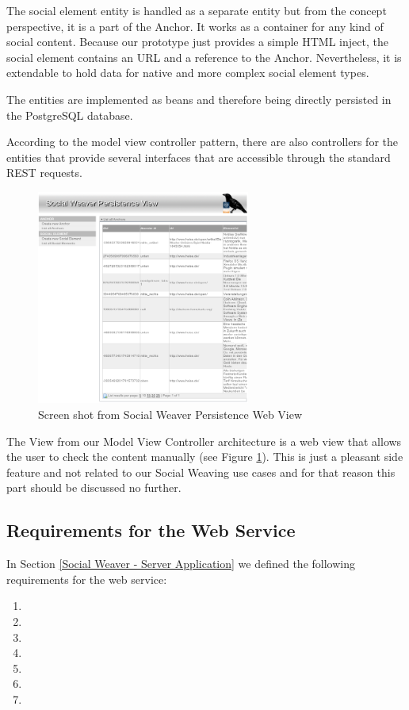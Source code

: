 The social element entity is handled as a separate entity but from the concept perspective, it is a part of the Anchor. It works as a container for any kind of social content. Because our prototype just provides a simple HTML inject, the social element contains an URL and a reference to the Anchor. Nevertheless, it is extendable to hold data for native and more complex social element types. 

The entities are implemented as beans and therefore being directly persisted in the PostgreSQL database.

According to the model view controller pattern, there are also controllers for the entities that provide several interfaces that are accessible through the standard REST requests. 

\begin{figure}\centering
		\includegraphics[width=7cm]{images/sowe-mvc-view-screenshot.png}
		\caption{Screen shot from Social Weaver Persistence Web View}
		\label{sowe-mvc-view-screenshot}
\end{figure} 

The View from our Model View Controller architecture is a web view that allows the user to check the content manually (see Figure \ref{sowe-mvc-view-screenshot}). This is just a pleasant side feature and not related to our Social Weaving use cases and for that reason this part should be discussed no further.

\newpage
\subsection{Requirements for the Web Service}
In Section \ref{Social Weaver - Server Application} we defined the following requirements for the web service:

\begin{enumerate}
\item \reqWSi
\item \reqWSii
\item \reqWSiii
\item \reqWSiv
\item \reqWSv
\item \reqWSvi
\item \reqWSvii
\end{enumerate}

